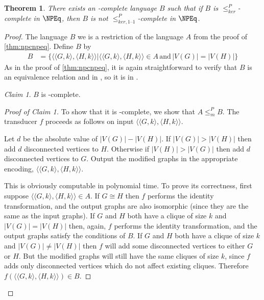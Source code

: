 \documentclass[draft]{article}
\newtheorem{theorem}{Theorem}[section]
\theoremstyle{definition} \newtheorem{openproblem}[openproblem]{Open problem}
\theoremstyle{definition} \newtheorem{definition}[definition]{Definition}
\theoremstyle{remark} \newtheorem{remark}{Remark}
\newtheorem{claim}{Claim}
\newcommand{\plain}[1]{\,\text{#1}\,} %
\newcommand{\kr}{\leq^{P}_{ker}} %
\newcommand{\kri}{\leq^{P}_{ker,1\text{--}1}} %
\newcommand{\mor}{\leq^{P}_{m}} %
\newcommand{\pair}[2]{\langle#1,#2\rangle} %
\begin{document}
\begin{theorem}
  There exists an \NP-complete language $B$ such that if $B$ is $\kr$-complete
  in $\NPEq$, then $B$ is not $\kri$-complete in $\NPEq$.
\end{theorem}
\begin{proof}
  The language $B$ we is a restriction of the language $A$ from the proof of \autoref{thm:npcnpeq}.
  Define $B$ by
  \begin{align*}
    B &= \{\pair{\pair{G}{k}}{\pair{H}{k}}|\pair{\pair{G}{k}}{\pair{H}{k}}\in A \plain{and} |V(G)|=|V(H)|\}
  \end{align*}
  As in the proof of \autoref{thm:npcnpeq}, it is again straightforward to verify that $B$ is an equivalence relation and in \NP, so it is in \NPEq.

  \begin{claim}
    $B$ is \NP-complete.
  \end{claim}
  \begin{proof}[Proof of Claim 1]
    To show that it is \NP-complete, we show that $A\mor B$.
    The transducer $f$ proceeds as follows on input $\pair{\pair{G}{k}}{\pair{H}{k}}$.

    Let $d$ be the absolute value of $|V(G)|-|V(H)|$.
    If $|V(G)|>|V(H)|$ then add $d$ disconnected vertices to $H$.
    Otherwise if $|V(H)|>|V(G)|$ then add $d$ disconnected vertices to $G$.
    Output the modified graphs in the appropriate encoding, $\pair{\pair{G}{k}}{\pair{H}{k}}$.

    This is obviously computable in polynomial time.
    To prove its correctness, first suppose $\pair{\pair{G}{k}}{\pair{H}{k}}\in A$.
    If $G\cong H$ then $f$ performs the identity transformation, and the output graphs are also isomorphic (since they are the same as the input graphs).
    If $G$ and $H$ both have a clique of size $k$ and $|V(G)|=|V(H)|$ then, again, $f$ performs the identity transformation, and the output graphs satisfy the conditions of $B$.
    If $G$ and $H$ both have a clique of size $k$ and $|V(G)|\neq|V(H)|$ then $f$ will add some disconnected vertices to either $G$ or $H$.
    But the modified graphs will still have the same cliques of size $k$, since $f$ adds only disconnected vertices which do not affect existing cliques.
    Therefore $f(\pair{\pair{G}{k}}{\pair{H}{k}})\in B$.


\end{proof}
\end{proof}
\end{document}
